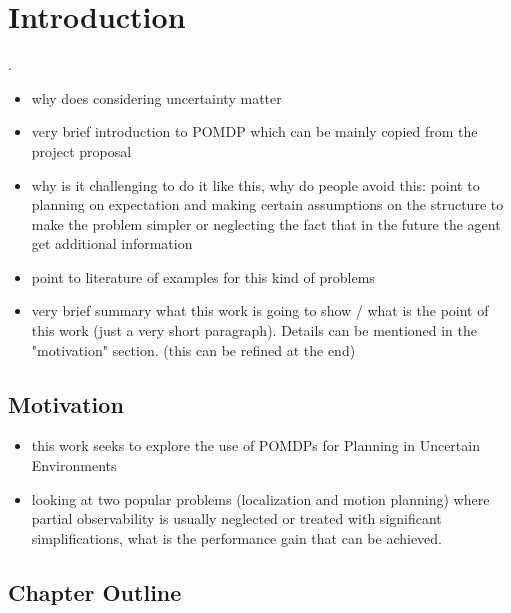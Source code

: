 \chapter{Introduction}

.
\begin{itemize}
  \item why does considering uncertainty matter
  \item very brief introduction to POMDP which can be mainly copied from the project proposal
  \item why is it challenging to do it like this, why do people avoid this:
        point to planning on expectation and making certain assumptions on the structure to
        make the problem simpler or neglecting the fact that
        in the future the agent get additional information
  \item point to literature of examples for this kind of problems
  \item very brief summary what this work is going to show / what is the point
        of this work (just a very short paragraph). Details can be mentioned in the
        "motivation" section. (this can be refined at the end)
\end{itemize}

\section{Motivation}


\begin{itemize}
  \item this work seeks to explore the use of POMDPs for Planning in Uncertain Environments
  \item looking at two popular problems (localization and motion planning)
  where partial observability is usually neglected or treated with significant
  simplifications, what is the performance gain that can be achieved.
\end{itemize}

\section{Chapter Outline}


